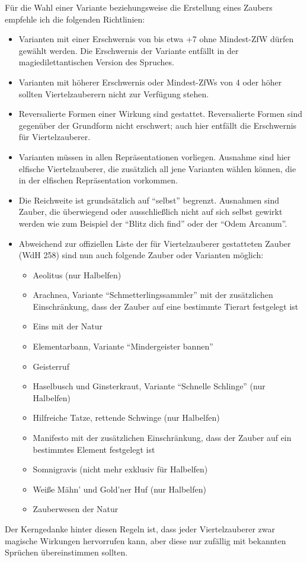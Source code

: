 Für die Wahl einer Variante beziehungsweise die Erstellung eines Zaubers empfehle ich die folgenden Richtlinien:
\begin{itemize}
	\item Varianten mit einer Erschwernis von bis etwa +7 ohne Mindest-ZfW dürfen gewählt werden. Die Erschwernis der Variante entfällt in der magiedilettantischen Version des Spruches.
	\item Varianten mit höherer Erschwernis oder Mindest-ZfWs von 4 oder höher sollten Viertelzauberern nicht zur Verfügung stehen.
	\item Reversalierte Formen einer Wirkung sind gestattet. Reversalierte Formen sind gegenüber der Grundform nicht erschwert; auch hier entfällt die Erschwernis für Viertelzauberer.
	\item Varianten müssen in allen Repräsentationen vorliegen. Ausnahme sind hier elfische Viertelzauberer, die zusätzlich all jene Varianten wählen können, die in der elfischen Repräsentation vorkommen.
	\item Die Reichweite ist grundsätzlich auf \enquote{selbst} begrenzt. Ausnahmen sind Zauber, die überwiegend oder ausschließlich nicht auf sich selbst gewirkt werden wie zum Beispiel der \enquote{Blitz dich find} oder der \enquote{Odem Arcanum}.
	\item Abweichend zur offiziellen Liste der für Viertelzauberer gestatteten Zauber (WdH 258) sind nun auch folgende Zauber oder Varianten möglich:
\begin{itemize}
	\item Aeolitus (nur Halbelfen)
	\item Arachnea, Variante \enquote{Schmetterlingssammler} mit der zusätzlichen Einschränkung, dass der Zauber auf eine bestimmte Tierart festgelegt ist
	\item Eins mit der Natur
	\item Elementarbann, Variante \enquote{Mindergeister bannen}
	\item Geisterruf
	\item Haselbusch und Ginsterkraut, Variante \enquote{Schnelle Schlinge} (nur Halbelfen)
	\item Hilfreiche Tatze, rettende Schwinge (nur Halbelfen)
	\item Manifesto mit der zusätzlichen Einschränkung, dass der Zauber auf ein bestimmtes Element festgelegt ist
	\item Somnigravis (nicht mehr exklusiv für Halbelfen)
	\item Weiße Mähn' und Gold'ner Huf (nur Halbelfen)
	\item Zauberwesen der Natur
\end{itemize}

\end{itemize}
Der Kerngedanke hinter diesen Regeln ist, dass jeder Viertelzauberer zwar magische Wirkungen hervorrufen kann, aber diese nur zufällig mit bekannten Sprüchen übereinstimmen sollten.

